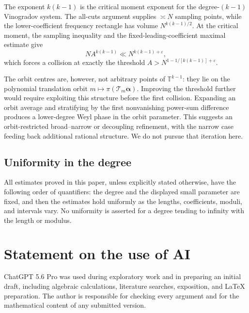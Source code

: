 \documentclass[11pt,reqno]{amsart}
\numberwithin{equation}{section}
\theoremstyle{definition}
\theoremstyle{remark}
\begin{document}
The exponent $k(k-1)$ is the critical moment exponent for the degree-$(k-1)$ Vinogradov system.  The all-cuts argument supplies $\asymp N$ sampling points, while the lower-coefficient frequency rectangle has volume $N^{k(k-1)/2}$.  At the critical moment, the sampling inequality and the fixed-leading-coefficient maximal estimate give
\[
  NA^{k(k-1)}\ll N^{k(k-1)+\varepsilon},
\]
which forces a collision at exactly the threshold
$A>N^{1-1/[k(k-1)]+\varepsilon}$.

The orbit centres are, however, not arbitrary points of $\mathbb T^{k-1}$: they lie on the polynomial translation orbit
$m\mapsto\pi(\mathcal T_m\boldsymbol\alpha)$.  Improving the threshold further would require exploiting this structure before the first collision.  Expanding an orbit average and stratifying by the first nonvanishing power-sum difference produces a lower-degree Weyl phase in the orbit parameter.  This suggests an orbit-restricted broad--narrow or decoupling refinement, with the narrow case feeding back additional rational structure.  We do not pursue that iteration here.

\subsection{Uniformity in the degree}

All estimates proved in this paper, unless explicitly stated otherwise, have the following order of quantifiers: the degree and the displayed small parameter are fixed, and then the estimates hold uniformly as the lengths, coefficients, moduli, and intervals vary.  No uniformity is asserted for a degree tending to infinity with the length or modulus.


\section*{Statement on the use of AI}

ChatGPT 5.6 Pro was used during exploratory work and in preparing an initial draft, including algebraic calculations, literature searches, exposition, and \LaTeX{} preparation.  The author is responsible for checking every argument and for the mathematical content of any submitted version.
\end{document}
